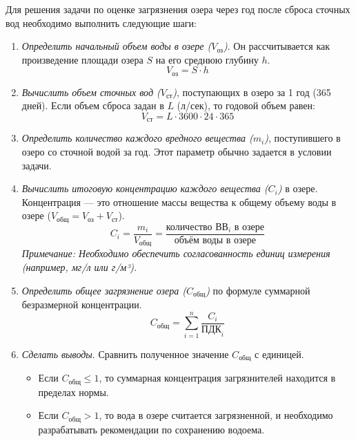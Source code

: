 Для решения задачи по оценке загрязнения озера через год после сброса сточных вод необходимо выполнить следующие шаги:

\begin{enumerate}
    \item \textit{Определить начальный объем воды в озере ($V_\text{оз}$)}. Он рассчитывается как произведение площади озера $S$ на его среднюю глубину $h$.
          $$
              V_\text{оз} = S \cdot h
          $$

    \item \textit{Вычислить объем сточных вод ($V_\text{ст}$)}, поступающих в озеро за 1 год (365 дней). Если объем сброса задан в $L$ (л/сек), то годовой объем равен:
          $$
              V_\text{ст} = L \cdot 3600 \cdot 24 \cdot 365
          $$

    \item \textit{Определить количество каждого вредного вещества ($m_i$)}, поступившего в озеро со сточной водой за год. Этот параметр обычно задается в условии задачи.

    \item \textit{Вычислить итоговую концентрацию каждого вещества ($C_i$)} в озере. Концентрация — это отношение массы вещества к общему объему воды в озере ($V_\text{общ} = V_\text{оз} + V_\text{ст}$).
          $$
              C_i = \frac{m_i}{V_\text{общ}} = \frac{\text{количество ВВ}_i \text{ в озере}}{\text{объём воды в озере}}
          $$
          \textit{Примечание: Необходимо обеспечить согласованность единиц измерения (например, мг/л или г/м³).}

    \item \textit{Определить общее загрязнение озера ($C_\text{общ}$)} по формуле суммарной безразмерной концентрации.
          $$
              C_\text{общ} = \sum_{i=1}^{n} \frac{C_i}{\text{ПДК}_i}
          $$

    \item \textit{Сделать выводы}. Сравнить полученное значение $C_\text{общ}$ с единицей.
          \begin{itemize}
              \item Если $C_\text{общ} \le 1$, то суммарная концентрация загрязнителей находится в пределах нормы.
              \item Если $C_\text{общ} > 1$, то вода в озере считается загрязненной, и необходимо разрабатывать рекомендации по сохранению водоема.
          \end{itemize}
\end{enumerate}



